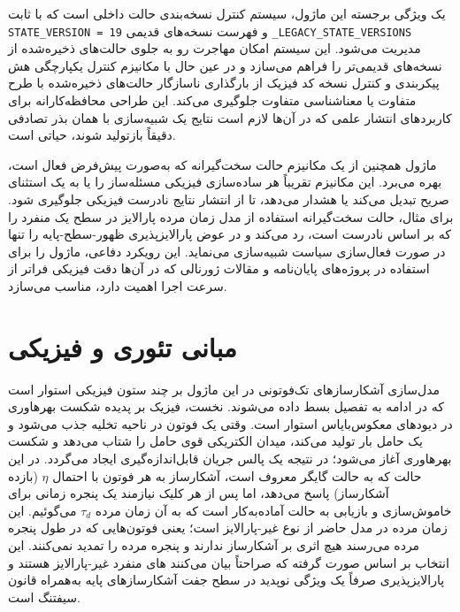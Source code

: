یک ویژگی برجسته این ماژول، سیستم کنترل نسخه‌بندی حالت داخلی است که با ثابت \texttt{STATE\_VERSION = 19} و فهرست نسخه‌های قدیمی \texttt{\_LEGACY\_STATE\_VERSIONS} مدیریت می‌شود. این سیستم امکان مهاجرت رو به جلوی حالت‌های ذخیره‌شده از نسخه‌های قدیمی‌تر را فراهم می‌سازد و در عین حال با مکانیزم کنترل یکپارچگی هش پیکربندی  و کنترل نسخه کد فیزیک  از بارگذاری ناسازگار حالت‌های ذخیره‌شده با طرح متفاوت  یا معناشناسی متفاوت  جلوگیری می‌کند. این طراحی محافظه‌کارانه برای کاربردهای انتشار علمی که در آن‌ها لازم است نتایج یک شبیه‌سازی با همان بذر تصادفی دقیقاً بازتولید شوند، حیاتی است.

ماژول همچنین از یک مکانیزم حالت سخت‌گیرانه  که به‌صورت پیش‌فرض فعال است، بهره می‌برد. این مکانیزم تقریباً هر ساده‌سازی فیزیکی مسئله‌ساز را یا به یک استثنای صریح تبدیل می‌کند یا هشدار می‌دهد، تا از انتشار نتایج نادرست فیزیکی جلوگیری شود. برای مثال، حالت سخت‌گیرانه استفاده از مدل زمان مرده پارالایز  در سطح یک  منفرد را که بر اساس  نادرست است، رد می‌کند و در عوض پارالایزپذیری ظهور-سطح-پایه را تنها در صورت فعال‌سازی سیاست  شبیه‌سازی می‌نماید. این رویکرد دفاعی، ماژول را برای استفاده در پروژه‌های پایان‌نامه و مقالات ژورنالی که در آن‌ها دقت فیزیکی فراتر از سرعت اجرا اهمیت دارد، مناسب می‌سازد.

\section{مبانی تئوری و فیزیکی}

مدل‌سازی آشکارسازهای تک‌فوتونی در این ماژول بر چند ستون فیزیکی استوار است که در ادامه به تفصیل بسط داده می‌شوند. نخست، فیزیک  بر پدیده شکست بهرهاوری  در دیودهای معکوس‌بایاس استوار است. وقتی یک فوتون در ناحیه تخلیه جذب می‌شود و یک حامل بار تولید می‌کند، میدان الکتریکی قوی حامل را شتاب می‌دهد و شکست بهرهاوری آغاز می‌شود؛ در نتیجه یک پالس جریان قابل‌اندازه‌گیری ایجاد می‌گردد. در این حالت که به حالت گایگر  معروف است، آشکارساز به هر فوتون با احتمال $\eta$ (بازده آشکارساز) پاسخ می‌دهد، اما پس از هر کلیک نیازمند یک پنجره زمانی برای خاموش‌سازی  و بازیابی به حالت آماده‌به‌کار است که به آن زمان مرده $\tau_d$ می‌گوئیم. این زمان مرده در مدل حاضر از نوع غیر-پارالایز  است؛ یعنی فوتون‌هایی که در طول پنجره مرده می‌رسند هیچ اثری بر آشکارساز ندارند و پنجره مرده را تمدید نمی‌کنند. این انتخاب بر اساس  صورت گرفته که صراحتاً بیان می‌کنند های منفرد غیر-پارالایز هستند و پارالایزپذیری صرفاً یک ویژگی نوپدید  در سطح جفت آشکارسازهای پایه به‌همراه قانون سیفتنگ  است.

